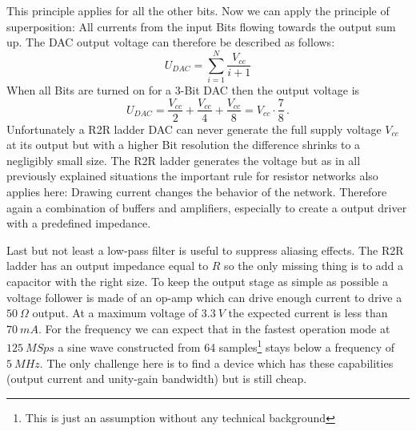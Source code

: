 This principle applies for all the other bits. Now we can apply the principle of superposition: All currents from the input Bits flowing towards the output sum up. The DAC output voltage can therefore be described as follows:
\[
U_{DAC} = \sum_{i = 1}^N \frac{V_{cc}}{i + 1}
\]
When all Bits are turned on for a 3-Bit DAC then the output voltage is
\[
	U_{DAC} = \frac{V_{cc}}{2} + \frac{V_{cc}}{4} + \frac{V_{cc}}{8} = V_{cc} \cdot \frac{7}{8}\,.
\]
Unfortunately a R2R ladder DAC can never generate the full supply voltage $V_{cc}$ at its output but with a higher Bit resolution the difference shrinks to a negligibly small size. The R2R ladder generates the voltage but as in all previously explained situations the important rule for resistor networks also applies here: Drawing current changes the behavior of the network. Therefore again a combination of buffers and amplifiers, especially to create a output driver with a predefined impedance.

Last but not least a low-pass filter is useful to suppress aliasing effects. The R2R ladder has an output impedance equal to $R$ so the only missing thing is to add a capacitor with the right size. To keep the output stage as simple as possible a voltage follower is made of an op-amp which can drive enough current to drive a $\SI{50}{\Omega}$ output. At a maximum voltage of $\SI{3,3}{V}$ the expected current is less than $\SI{70}{mA}$. For the frequency we can expect that in the fastest operation mode at $\SI{125}{MSps}$ a sine wave constructed from 64 samples\footnote{This is just an assumption without any technical background} stays below a frequency of $\SI{5}{MHz}$. The only challenge here is to find a device which has these capabilities (output current and unity-gain bandwidth) but is still cheap.
